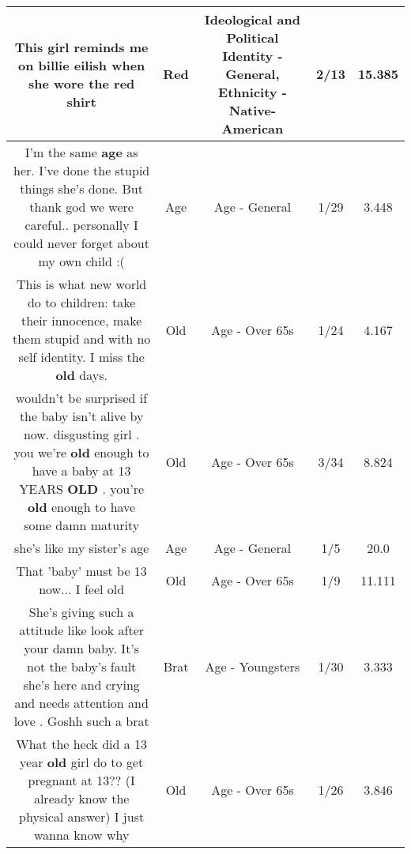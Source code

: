 \documentclass[11pt]{article}
\newlength\mylength
\begin{document}
\begin{center}
\begin{longtable}{|C{.65\mylength}|C{.30\mylength}|C{.12\mylength}|C{.12\mylength}|C{.12\mylength}|}
  \small This girl reminds me on billie eilish when she wore the \textbf{r\textbf{ed}} shirt\normalsize   & Red &  Ideological and Political Identity - General, Ethnicity - Native-American & 2/13 & 15.385 \\  \hline
  \small I'm the same \textbf{age} as her. I've done the stupid things she's done. But thank god we were careful.. personally I could never forget about my own child :(\normalsize   & Age & Age - General & 1/29 & 3.448 \\  \hline
  \small This is what new world do to children: take their innocence, make them stupid and with no self identity. I miss the \textbf{old} days.\normalsize   & Old & Age - Over 65s & 1/24 & 4.167 \\  \hline
  \small wouldn't be surprised if the baby isn't alive by now. disgusting girl . you we're \textbf{old} enough to have a baby at 13 YEARS \textbf{OLD} . you're \textbf{old} enough to have some damn maturity\normalsize   & Old & Age - Over 65s & 3/34 & 8.824 \\  \hline
  \small she's like my sister's age\normalsize   & Age & Age - General & 1/5 & 20.0 \\  \hline
  \small That 'baby' must be 13 now... I feel old\normalsize   & Old & Age - Over 65s & 1/9 & 11.111 \\  \hline
  \small She's giving such a attitude like look after your damn baby. It's not the baby's fault she's here and crying and needs attention and love . Goshh such a brat\normalsize   & Brat & Age - Youngsters & 1/30 & 3.333 \\  \hline
  \small What the heck did a 13 year \textbf{old} girl do to get pregnant at 13?? (I already know the physical answer) I just wanna know why\normalsize   & Old & Age - Over 65s & 1/26 & 3.846 \\  \hline

\end{longtable}
\end{center}
\end{document}
